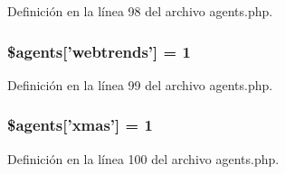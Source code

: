 Definición en la línea 98 del archivo agents.\-php.

\hypertarget{agents_8php_aeb191d4a82f4aa743c8edf2a3971cde6}{
\subsubsection[{\$agents}]{\setlength{\rightskip}{0pt plus 5cm}\$agents\mbox{[}'webtrends'\mbox{]} = 1}}\label{agents_8php_aeb191d4a82f4aa743c8edf2a3971cde6}


Definición en la línea 99 del archivo agents.\-php.

\hypertarget{agents_8php_a75699f659be719d1339958cf2cfa182d}{
\subsubsection[{\$agents}]{\setlength{\rightskip}{0pt plus 5cm}\$agents\mbox{[}'xmas'\mbox{]} = 1}}\label{agents_8php_a75699f659be719d1339958cf2cfa182d}


Definición en la línea 100 del archivo agents.\-php.

